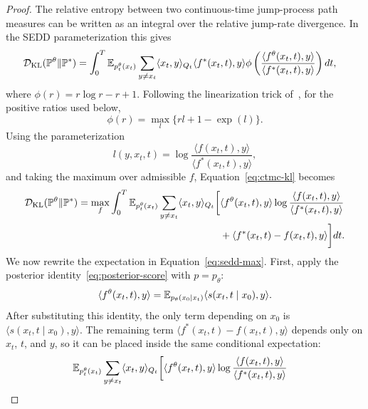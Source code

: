 \begin{proof}
The relative entropy between two continuous-time jump-process path measures can
be written as an integral over the relative jump-rate divergence. In the SEDD
parameterization this gives
\begin{equation}
\label{eq:ctmc-kl}
\begin{aligned}
    \mathcal{D}_{\mathrm{KL}}(\mathbb{P}^\theta\|\mathbb{P}^*)
    &=
    \int_0^T
    \mathbb{E}_{p_t^\theta(x_t)}
    \sum_{y\neq x_t}
    \langle x_t,y\rangle_{Q_t}
    \langle f^*(x_t,t),y\rangle
    \phi
    \left(
      \frac{\langle f^\theta(x_t,t),y\rangle}
           {\langle f^*(x_t,t),y\rangle}
    \right)dt,
\end{aligned}
\end{equation}
where \(\phi(r)=r\log r-r+1\). Following the linearization trick
of~\citet{kornilov2025universal}, for the positive ratios used below,
\[
    \phi(r)=\max_l \{rl+1-\exp(l)\}.
\]
Using the parameterization
\[
    l(y,x_t,t)
    =
    \log
    \frac{\langle f(x_t,t),y\rangle}
         {\langle f^*(x_t,t),y\rangle},
\]
and taking the maximum over admissible \(f\), Equation~\eqref{eq:ctmc-kl}
becomes
\begin{equation}
\label{eq:sedd-max}
\begin{aligned}
    \mathcal{D}_{\mathrm{KL}}(\mathbb{P}^\theta\|\mathbb{P}^*)
    =
    \max_f
    \int_0^T
    \mathbb{E}_{p_t^\theta(x_t)}
    \sum_{y\neq x_t}
    \langle x_t,y\rangle_{Q_t}
    \biggl[
      &\langle f^\theta(x_t,t),y\rangle
      \log
      \frac{\langle f(x_t,t),y\rangle}
           {\langle f^*(x_t,t),y\rangle}
      \\
      &+
      \langle f^*(x_t,t)-f(x_t,t),y\rangle
    \biggr]dt.
\end{aligned}
\end{equation}
We now rewrite the expectation in Equation~\eqref{eq:sedd-max}. First,
apply the posterior identity~\eqref{eq:posterior-score} with
\(p=p_\theta\):
\[
    \langle f^\theta(x_t,t),y\rangle
    =
    \mathbb{E}_{p_\theta(x_0\mid x_t)}
    \langle s(x_t,t\mid x_0),y\rangle .
\]
After substituting this identity, the only term depending on \(x_0\) is
\(\langle s(x_t,t\mid x_0),y\rangle\). The remaining term
\(\langle f^*(x_t,t)-f(x_t,t),y\rangle\) depends only on \(x_t\), \(t\), and
\(y\), so it can be placed inside the same conditional expectation:
\[
\begin{aligned}
&\EE_{p_t^\theta(x_t)}
\sum_{y\neq x_t}
\langle x_t,y\rangle_{Q_t}
\biggl[
  \langle f^\theta(x_t,t),y\rangle
  \log
  \frac{\langle f(x_t,t),y\rangle}
       {\langle f^*(x_t,t),y\rangle}

\end{aligned}\]
\end{proof}
